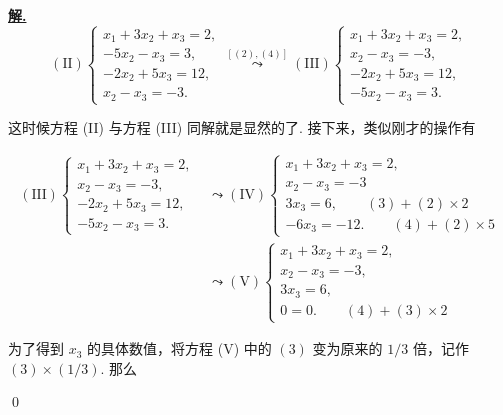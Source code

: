 \documentclass[10pt,openany]{article}
\theoremstyle{thmstyle} %
\theoremstyle{defstyle} %
\theoremstyle{prostyle} %
\theoremstyle{exastyle}
\theoremstyle{remstyle}
\newenvironment{solution}{\par\underline{\textbf{解.}} \;\fangsong}{\qed\par}
\begin{document}
\begin{solution}
	\[ (\text{II}) \left\{
	\begin{array}{l}
		x_1 + 3x_2 + x_3 = 2, \\
		-5x_2 - x_3 = 3, \\
		-2x_2 + 5x_3 = 12, \\
		x_2 - x_3 = -3.
	\end{array}
	\right. \overset{[(2),(4)]}{\leadsto} (\text{III}) \left\{
	\begin{array}{l}
		x_1 + 3x_2 + x_3 = 2, \\
		x_2 - x_3 = -3, \\
		-2x_2 + 5x_3 = 12, \\
		-5x_2 - x_3 = 3.
	\end{array}
	\right. \]
	
	这时候方程 (II) 与方程 (III) 同解就是显然的了. 接下来，类似刚才的操作有
	
	 \begin{align*}
		(\text{III}) \left\{
		\begin{array}{l}
			x_1 + 3x_2 + x_3 = 2, \\
			x_2 - x_3 = -3, \\
			-2x_2 + 5x_3 = 12, \\
			-5x_2 - x_3 = 3.
		\end{array}
		\right. &\leadsto (\text{IV}) \left\{
		\begin{array}{l}
			x_1 + 3x_2 + x_3 = 2, \\
			x_2 - x_3 = -3\\
			3x_3 = 6 , \qquad (3)+(2) \times 2 \\
			-6x_3 = -12. \qquad (4)+(2) \times 5
		\end{array}
		\right. \\
		&\leadsto (\text{V}) \left\{
		\begin{array}{l}
			x_1 + 3x_2 + x_3 = 2, \\
			x_2 - x_3 = -3, \\
			3x_3 = 6, \\
			0 = 0. \qquad (4)+(3) \times 2
		\end{array}
		\right.
	\end{align*}  
	
	
	为了得到 \( x_3 \) 的具体数值，将方程 (V) 中的 \( (3) \) 变为原来的 \( 1/3 \) 倍，记作 \( (3) \times (1/3) \). 那么
	

\end{solution}
\end{document}
